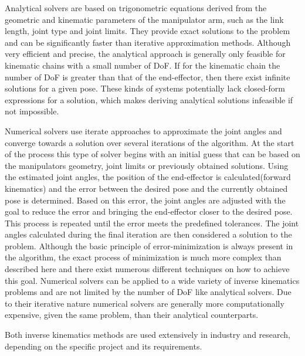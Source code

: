 Analytical solvers are based on trigonometric equations derived from the geometric and kinematic parameters of the manipulator arm, such as the link length, joint type and joint limits.
They provide exact solutions to the problem and can be significantly faster than iterative approximation methods.
Although very efficient and precise, the analytical approach is generally only feasible for kinematic chains with a small number of DoF.
If for the kinematic chain the number of DoF is greater than that of the end-effector, then there exist infinite solutions for a given pose.
These kinds of systems potentially lack closed-form expressions for a solution, which makes deriving analytical solutions infeasible if not impossible.


Numerical solvers use iterate approaches to approximate the joint angles and converge towards a solution over several iterations of the algorithm.
At the start of the process this type of solver begins with an initial guess that can be based on the manipulators geometry, joint limits or previously obtained solutions.
Using the estimated joint angles, the position of the end-effector is calculated(forward kinematics) and the error between the desired pose and the currently obtained pose is determined.
Based on this error, the joint angles are adjusted with the goal to reduce the error and bringing the end-effector closer to the desired pose.
This process is repeated until the error meets the predefined tolerances.
The joint angles calculated during the final iteration are then considered a solution to the problem.
Although the basic principle of error-minimization is always present in the algorithm, the exact process of minimization is much more complex than described here and there exist numerous different techniques on how to achieve this goal.
Numerical solvers can be applied to a wide variety of inverse kinematics problems and are not limited by the number of DoF like analytical solvers.
Due to their iterative nature numerical solvers are generally more computationally expensive, given the same problem, than their analytical counterparts.

Both inverse kinematics methods are used extensively in industry and research, depending on the specific project and its requirements.




